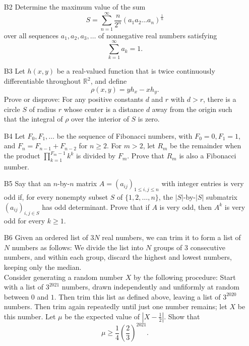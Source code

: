 \documentclass[amssymb,twocolumn,pra,10pt,aps,nofootinbib]{revtex4-1}
\begin{document}
\begin{itemize}
\item[B2]
Determine the maximum value of the sum
\[
S=\sum_{n=1}^{\infty}\frac{n}{2^n}(a_1 a_2 \dots a_n)^{\frac{1}{n}}
\]
over all sequences $a_1,a_2,a_3,\dots$ of nonnegative real numbers satisfying
\[
\sum_{k=1}^{\infty}a_k=1.
\]

\item[B3]
Let $h(x,y)$ be a real-valued function that is twice continuously differentiable throughout $\mathbb{R}^2$, and define
\[
\rho (x,y)=yh_x -xh_y .
\]
Prove or disprove: For any positive constants $d$ and $r$ with $d>r$, there is a circle $S$ of radius $r$ whose center is a distance $d$ away from the origin such that the integral of $\rho$ over the interior of $S$ is zero.

\item[B4]
Let $F_0,F_1,\dots$ be the sequence of Fibonacci numbers, with $F_0=0,F_1=1$, and $F_n=F_{n-1}+F_{n-2}$ for $n \ge 2$. For $m>2$, let $R_m$ be the remainder when the product $\prod_{k=1}^{F_m-1} k^k$ is divided by $F_m$. Prove that $R_m$ is also a Fibonacci number.

\item[B5]
Say that an $n$-by-$n$ matrix $A=(a_{ij})_{1\le i,j \le n}$ with integer entries is very odd if, for every nonempty subset $S$ of $\{1,2,\dots,n \}$, the $|S|$-by-$|S|$ submatrix $(a_{ij})_{i,j \in S}$ has odd determinant. Prove that if $A$ is very odd, then $A^k$ is very odd for every $k \ge 1$.

\item[B6]
Given an ordered list of $3N$ real numbers, we can trim it to form a list of $N$ numbers as follows: We divide the list into $N$ groups of $3$ consecutive numbers, and within each group, discard the highest and lowest numbers, keeping only the median. \\
Consider generating a random number $X$ by the following procedure: Start with a list of $3^{2021}$ numbers, drawn independently and unfiformly at random between $0$ and $1$. Then trim this list as defined above, leaving a list of $3^{2020}$ numbers. Then trim again repeatedly until just one number remains; let $X$ be this number. Let $\mu$ be the expected value of $\left|X-\frac{1}{2} \right|$. Show that
\[
\mu \ge \frac{1}{4}\left(\frac{2}{3} \right)^{2021}.
\]

\end{itemize}
\end{document}
